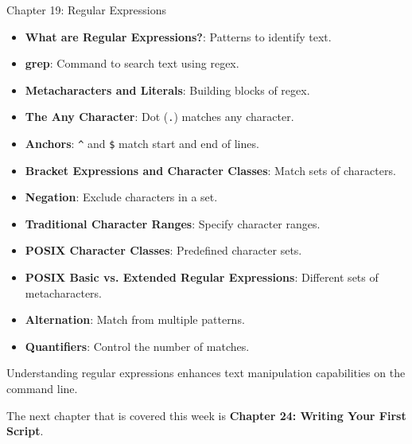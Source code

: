 \begin{notes}{Chapter 19: Regular Expressions}
\begin{highlight}
    \begin{itemize}
        \item \textbf{What are Regular Expressions?}: Patterns to identify text.
        \item \textbf{grep}: Command to search text using regex.
        \item \textbf{Metacharacters and Literals}: Building blocks of regex.
        \item \textbf{The Any Character}: Dot (\texttt{.}) matches any character.
        \item \textbf{Anchors}: \texttt{\^} and \texttt{\$} match start and end of lines.
        \item \textbf{Bracket Expressions and Character Classes}: Match sets of characters.
        \item \textbf{Negation}: Exclude characters in a set.
        \item \textbf{Traditional Character Ranges}: Specify character ranges.
        \item \textbf{POSIX Character Classes}: Predefined character sets.
        \item \textbf{POSIX Basic vs. Extended Regular Expressions}: Different sets of metacharacters.
        \item \textbf{Alternation}: Match from multiple patterns.
        \item \textbf{Quantifiers}: Control the number of matches.
    \end{itemize}
    
    Understanding regular expressions enhances text manipulation capabilities on the command line.
    
    \end{highlight}
\end{notes}

The next chapter that is covered this week is \textbf{Chapter 24: Writing Your First Script}.

